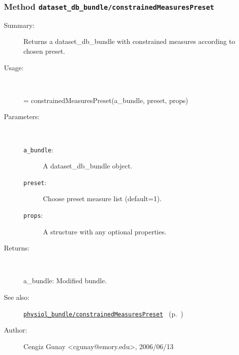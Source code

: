 \subsubsection[Method \texttt{constrainedMeasuresPreset}]{Method \texttt{dataset\_db\_bundle/constrainedMeasuresPreset}}%
%
\label{ref_dataset_db_bundle__constrainedMeasuresPreset}%
\hypertarget{ref_dataset_db_bundle__constrainedMeasuresPreset}{}%
\begin{description}
\item[Summary:]Returns a dataset\_db\_bundle with constrained measures according to chosen preset.
%
\item[Usage:]~%
\begin{lyxcode}%
[a\_bundle test\_names] = constrainedMeasuresPreset(a\_bundle, preset, props)
%
\end{lyxcode}%
%
%
\item[Parameters:]~
\begin{description}%
\item[\texttt{a\_bundle}:]
 A dataset\_db\_bundle object.
\item[\texttt{preset}:]
 Choose preset measure list (default=1).
\item[\texttt{props}:]
 A structure with any optional properties.
\end{description}%
%
\item[Returns:]~

	a\_bundle: Modified bundle.
%
%
\item[See also:]%
\hyperlink{ref_physiol_bundle__constrainedMeasuresPreset}{\texttt{physiol\_bundle/constrainedMeasuresPreset}}%
\ (p.~\pageref{ref_physiol_bundle__constrainedMeasuresPreset})%
%
%
\item[Author:]%
Cengiz Gunay <cgunay@emory.edu>, 2006/06/13%
\end{description}
\methodline%
